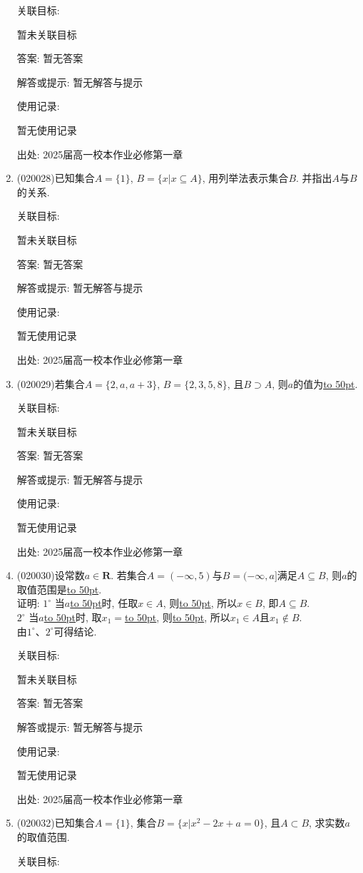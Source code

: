 \documentclass[10pt,a4paper]{article}
\newcommand{\blank}[1]{\underline{\hbox to #1pt{}}}
\begin{document}
\begin{enumerate}[1.]
关联目标:

暂未关联目标

答案: 暂无答案

解答或提示: 暂无解答与提示

使用记录:

暂无使用记录


出处: 2025届高一校本作业必修第一章
\item { (020028)}已知集合$A=\{1\}$, $B=\{x|x\subseteq A\}$, 用列举法表示集合$B$. 并指出$A$与$B$的关系.


关联目标:

暂未关联目标

答案: 暂无答案

解答或提示: 暂无解答与提示

使用记录:

暂无使用记录


出处: 2025届高一校本作业必修第一章
\item { (020029)}若集合$A=\{2,a,a+3\}$, $B=\{2,3,5,8\}$, 且$B\supset A$, 则$a$的值为\blank{50}.


关联目标:

暂未关联目标

答案: 暂无答案

解答或提示: 暂无解答与提示

使用记录:

暂无使用记录


出处: 2025届高一校本作业必修第一章
\item { (020030)}设常数$a\in \mathbf{R}$. 若集合$A=(-\infty ,5)$与$B=(-\infty ,a]$满足$A\subseteq B$, 则$a$的取值范围是\blank{50}.\\
证明: $1^\circ$ 当$a$\blank{50}时, 任取$x\in A$, 则\blank{50}, 所以$x\in B$, 即$A\subseteq B$.\\ 
$2^\circ$ 当$a$\blank{50}时, 取$x_1=$\blank{50}, 则\blank{50}, 所以$x_1\in A$且$x_1\not \in B$.\\
由$1^\circ$、$2^\circ$可得结论.


关联目标:

暂未关联目标

答案: 暂无答案

解答或提示: 暂无解答与提示

使用记录:

暂无使用记录


出处: 2025届高一校本作业必修第一章
\item { (020032)}已知集合$A=\{1\}$, 集合$B=\{x|x^2-2x+a=0\}$, 且$A\subset B$, 求实数$a$的取值范围.


关联目标:


\end{enumerate}
\end{document}
